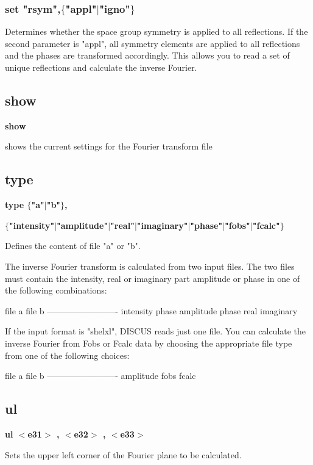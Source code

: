 \subsubsection{set "rsym",$ \{$"appl"$| $"igno"$\} $}
\par
Determines whether the space group symmetry is applied to all reflections. 
If the second parameter is "appl", all symmetry elements are applied to 
all reflections and the phases are transformed accordingly. This allows 
you to read a set of unique reflections and calculate the inverse Fourier. 
\subsection*{show}
{\bf show \par }
\par
\vspace{3pt}
shows the current settings for the Fourier transform file 
\subsection*{type}
{\bf type $ \{$"a"$| $"b"$\} $, \par }
{\bf      $ \{$"intensity"$| $"amplitude"$| $"real"$| $"imaginary"$| $"phase"$| $"fobs"$| $"fcalc"$\} $ \par }
\par
\vspace{3pt}
Defines the content of file "a" or "b". 
\par
The inverse Fourier transform is calculated from two input files. 
The two files must contain the intensity, real or imaginary part 
amplitude or phase in one of the following combinations: 
\par
\begin{MacVerbatim}
file a          file b
-------------------------
intensity       phase
amplitude       phase
real            imaginary
\end{MacVerbatim}
If the input format is "shelxl", DISCUS reads just one file. You can 
calculate the inverse Fourier from Fobs or Fcalc data by choosing the 
appropriate file type from one of the following choices: 
\par
\begin{MacVerbatim}
file a          file b
-------------------------
amplitude
fobs
fcalc
\end{MacVerbatim}
\subsection*{ul}
{\bf ul $ <$e31$> $ , $ <$e32$> $ , $ <$e33$> $ \par }
\par
\vspace{3pt}
Sets the upper left corner of the Fourier plane to be calculated. 
